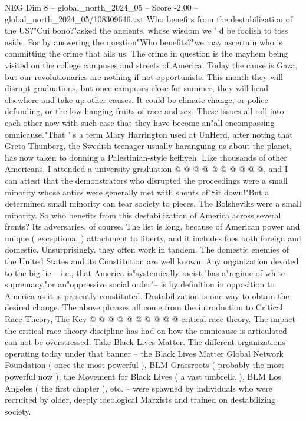 \begin{textsample}{NEG Dim 8 – global\_north\_2024\_05 – Score -2.00 – global\_north\_2024\_05/108309646.txt}  \label{ex:f8_neg_268}
Who benefits from the destabilization of the US?"Cui bono?"asked the ancients, whose wisdom we ' d be foolish to toss aside.
For by answering the question"Who benefits?"we may ascertain who is committing the crime that ails us.
The crime in question is the mayhem being visited on the college campuses and streets of America.
Today the cause is Gaza, but our revolutionaries are nothing if not opportunists.
This month they will disrupt graduations, but once campuses close for summer, they will head elsewhere and take up other causes.
It could be climate change, or police defunding, or the low-hanging fruits of race and sex.
These issues all roll into each other now with such ease that they have become an"all-encompassing omnicause."That ' s a term Mary Harrington used at UnHerd, after noting that Greta Thunberg, the Swedish teenager usually haranguing us about the planet, has now taken to donning a Palestinian-style keffiyeh.
Like thousands of other Americans, I attended a university graduation @ @ @ @ @ @ @ @ @ @, and I can attest that the demonstrators who disrupted the proceedings were a small minority whose antics were generally met with shouts of"Sit down!"But a determined small minority can tear society to pieces.
The Bolsheviks were a small minority.
So who benefits from this destabilization of America across several fronts?
Its adversaries, of course.
The list is long, because of American power and unique ( exceptional ) attachment to liberty, and it includes foes both foreign and domestic.
Unsurprisingly, they often work in tandem.
The domestic enemies of the United States and its Constitution are well known.
Any organization devoted to the big lie -- i.e., that America is"systemically racist,"has a"regime of white supremacy,"or an"oppressive social order"-- is by definition in opposition to America as it is presently constituted.
Destabilization is one way to obtain the desired change.
The above phrases all come from the introduction to Critical Race Theory, The Key @ @ @ @ @ @ @ @ @ @ critical race theory.
The impact the critical race theory discipline has had on how the omnicause is articulated can not be overstressed.
Take Black Lives Matter.
The different organizations operating today under that banner -- the Black Lives Matter Global Network Foundation ( once the most powerful ), BLM Grassroots ( probably the most powerful now ), the Movement for Black Lives ( a vast umbrella ), BLM Los Angeles ( the first chapter ), etc. -- were spawned by individuals who were recruited by older, deeply ideological Marxists and trained on destabilizing society.

\end{textsample}

